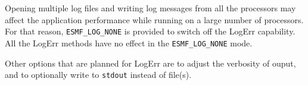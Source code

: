 Opening multiple log files and writing log messages from all the processors
may affect the application performance while running on a large number of
processors.  For that reason, {\tt ESMF\_LOG\_NONE} is provided to
switch off the LogErr capability.  All the LogErr methods have no effect
in the {\tt ESMF\_LOG\_NONE} mode. 
   
Other options that are planned for LogErr are to adjust the verbosity of ouput, 
and to optionally write to {\tt stdout} instead of file(s).




